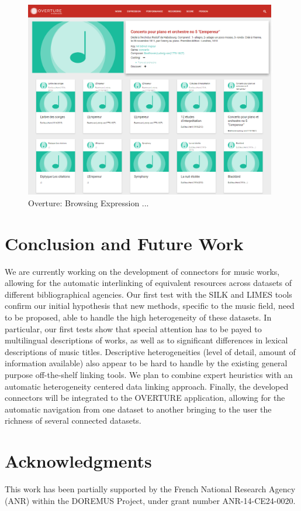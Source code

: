 \documentclass[runningheads,a4paper]{llncs}
\begin{document}
\begin{figure}
  \centering
  \includegraphics[width=11cm]{img/overture-detail.png}
  \caption{Overture: Browsing Expression ...}
  \label{fig:overture-detail}
\end{figure}



\section{Conclusion and Future Work}
\label{sec:conclusion}
We are currently working on the development of connectors for music works, allowing for the automatic interlinking of equivalent resources across datasets of different bibliographical agencies. Our first test with the SILK \cite{} and LIMES \cite{} tools confirm our initial hypothesis that new methods, specific to the music field, need to be proposed, able to handle the high heterogeneity of these datasets. In particular, our first tests show that special attention has to be payed to multilingual descriptions of works, as well as to significant differences in lexical descriptions of music titles. Descriptive heterogeneities (level of detail, amount of information available) also appear to be hard to handle by the existing general purpose off-the-shelf linking tools. We plan to combine expert heuristics with an automatic heterogeneity centered data linking approach. Finally, the developed connectors will be integrated to the OVERTURE application, allowing for the automatic navigation from one dataset to another bringing to the user the richness of several connected datasets.

\section*{Acknowledgments}
This work has been partially supported by the French National Research Agency (ANR) within the DOREMUS Project, under grant number ANR-14-CE24-0020.



\end{document}
